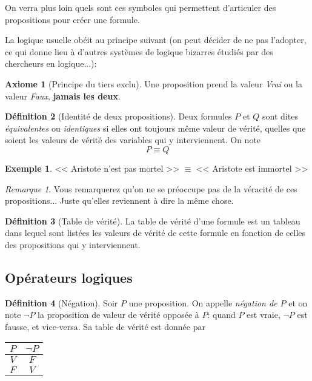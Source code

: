 \documentclass[11pt]{article}
\theoremstyle{definition}
\newtheorem{defn}{Définition}[section]
\newtheorem{axio}[defn]{Axiome}
\newtheorem{exe}{Exemple}
\theoremstyle{remark}
\newtheorem{rem}{Remarque}
\begin{document}
On verra plus loin quels sont ces symboles qui permettent d'articuler des propositions pour créer une formule.



La logique usuelle obéit au principe suivant (on peut décider de ne pas l'adopter, ce qui donne lieu à d'autres systèmes de logique bizarres étudiés par des chercheurs en logique...):

\begin{axio}[Principe du tiers exclu]
Une proposition prend la valeur \textit{Vrai} ou la valeur \textit{Faux}, \textbf{jamais les deux}.
\end{axio}

\begin{defn}[Identité de deux propositions]
Deux formules $P$ et $Q$ sont dites \textit{équivalentes} ou \textit{identiques} si elles ont toujours même valeur de vérité, quelles que soient les valeurs de vérité des variables qui y interviennent. On note
\[P\equiv Q
\]
\end{defn}

\begin{exe}\leavevmode
<< Aristote n'est pas mortel >> $\equiv$ << Aristote est immortel >>
\end{exe}

\begin{rem}Vous remarquerez qu'on ne se préoccupe pas de la véracité de ces propositions... Juste qu'elles reviennent à dire la même chose.
\end{rem}

\begin{defn}[Table de vérité]
La table de vérité d'une formule est un tableau dans lequel sont listées les valeurs de vérité de cette formule en fonction de celles des propositions qui y interviennent.
\end{defn}






\subsection{Opérateurs logiques}

\begin{defn}[Négation]
Soir $P$ une proposition. On appelle \textit{négation de $P$} et on note $\neg P$ la proposition de valeur de vérité opposée à $P$: quand $P$ est vraie, $\neg P$ est fausse, et vice-versa. Sa table de vérité est donnée par
\begin{center}
  \begin{tabular}{|c|c|}\hline
  $P$ & $\neg P$ \\ \hline
  $V$ & $F$ \\ \hline
  $F$ & $V$ \\ \hline
  \end{tabular}
\end{center}
\end{defn}
\end{document}
